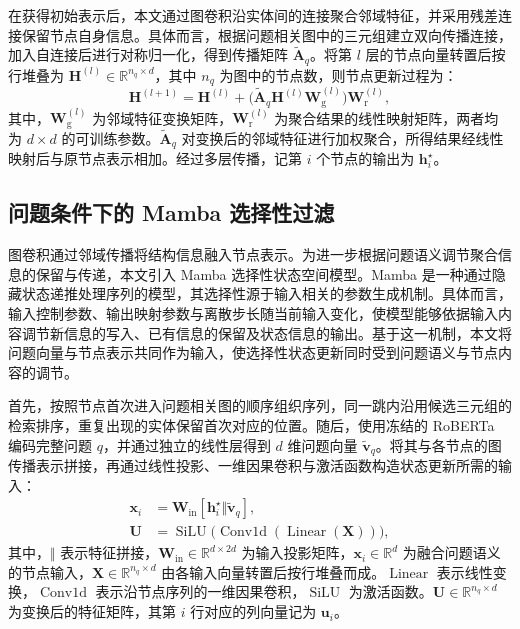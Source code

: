 在获得初始表示后，本文通过图卷积沿实体间的连接聚合邻域特征，并采用残差连接保留节点自身信息。具体而言，根据问题相关图中的三元组建立双向传播连接，加入自连接后进行对称归一化，得到传播矩阵 $\widetilde{\bm{A}}_q$。将第 $l$ 层的节点向量转置后按行堆叠为 $\bm{H}^{(l)}\in\mathbb{R}^{n_q\times d}$，其中 $n_q$ 为图中的节点数，则节点更新过程为：
\begin{equation}
\bm{H}^{(l+1)}
=\bm{H}^{(l)}
+\bigl(\widetilde{\bm{A}}_q\bm{H}^{(l)}\bm{W}_{\mathrm{g}}^{(l)}\bigr)
\bm{W}_{\mathrm{r}}^{(l)},
\end{equation}
其中，$\bm{W}_{\mathrm{g}}^{(l)}$ 为邻域特征变换矩阵，$\bm{W}_{\mathrm{r}}^{(l)}$ 为聚合结果的线性映射矩阵，两者均为 $d\times d$ 的可训练参数。$\widetilde{\bm{A}}_q$ 对变换后的邻域特征进行加权聚合，所得结果经线性映射后与原节点表示相加。经过多层传播，记第 $i$ 个节点的输出为 $\bm{h}_i^\star$。

\subsection{问题条件下的 Mamba 选择性过滤}

图卷积通过邻域传播将结构信息融入节点表示。为进一步根据问题语义调节聚合信息的保留与传递，本文引入 Mamba 选择性状态空间模型。Mamba 是一种通过隐藏状态递推处理序列的模型，其选择性源于输入相关的参数生成机制\cite{gu2023mamba}。具体而言，输入控制参数、输出映射参数与离散步长随当前输入变化，使模型能够依据输入内容调节新信息的写入、已有信息的保留及状态信息的输出。基于这一机制，本文将问题向量与节点表示共同作为输入，使选择性状态更新同时受到问题语义与节点内容的调节。

首先，按照节点首次进入问题相关图的顺序组织序列，同一跳内沿用候选三元组的检索排序，重复出现的实体保留首次对应的位置。随后，使用冻结的 RoBERTa 编码完整问题 $q$，并通过独立的线性层得到 $d$ 维问题向量 $\widetilde{\bm{v}}_q$。将其与各节点的图传播表示拼接，再通过线性投影、一维因果卷积与激活函数构造状态更新所需的输入：
\begin{equation}
\begin{aligned}
\bm{x}_i&=\bm{W}_{\mathrm{in}}
[\bm{h}_i^\star\Vert\widetilde{\bm{v}}_q],\\
\bm{U}&=\operatorname{SiLU}
\bigl(\operatorname{Conv1d}(\operatorname{Linear}(\bm{X}))\bigr),
\end{aligned}
\end{equation}
其中，$\Vert$ 表示特征拼接，$\bm{W}_{\mathrm{in}}\in\mathbb{R}^{d\times 2d}$ 为输入投影矩阵，$\bm{x}_i\in\mathbb{R}^{d}$ 为融合问题语义的节点输入，$\bm{X}\in\mathbb{R}^{n_q\times d}$ 由各输入向量转置后按行堆叠而成。$\operatorname{Linear}$ 表示线性变换，$\operatorname{Conv1d}$ 表示沿节点序列的一维因果卷积，$\operatorname{SiLU}$ 为激活函数。$\bm{U}\in\mathbb{R}^{n_q\times d}$ 为变换后的特征矩阵，其第 $i$ 行对应的列向量记为 $\bm{u}_i$。


